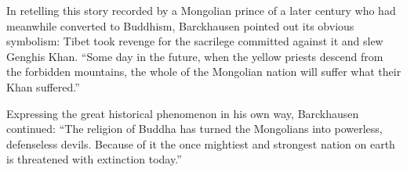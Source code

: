 In retelling this story recorded by a Mongolian prince of a later century who had meanwhile converted to Buddhism, Barckhausen pointed out its obvious symbolism: Tibet took revenge for the sacrilege committed against it and slew Genghis Khan. ``Some day in the future, when the yellow priests descend from the forbidden mountains, the whole of the Mongolian nation will suffer what their Khan suffered.''

Expressing the great historical phenomenon in his own way, Barckhausen continued: ``The religion of Buddha has turned the Mongolians into powerless, defenseless devils. Because of it the once mightiest and strongest nation on earth is threatened with extinction today.''



